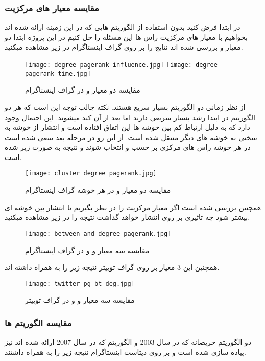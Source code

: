 \documentclass[12pt]{article}
\begin{document}
\subsubsection{مقایسه معیار های مرکزیت}

در ابتدا فرض کنيد بدون استفاده از الگوريتم هايی که در اين زمينه ارائه شده اند بخواهيم با معيار های
مرکزيت راس ها اين مسئله را حل کنيم در اين پروژه ابتدا دو معيار 
 و 
  بررسی شده اند 
نتايج را بر روی گراف اينستاگرام در زير مشاهده ميکنيد.

\begin{figure}[htbp]
\texttt{[image: degree pagerank influence.jpg]}
\texttt{[image: degree pagerank time.jpg]}
\caption{
مقایسه دو معیار
و
در گراف اینستاگرام
}
\end{figure}
\newpage

از نظر زمانی دو الگوريتم بسيار سريع هستند.
نکته جالب توجه اين است که هر دو الگوريتم در ابتدا رشد بسيار سريعی دارند اما بعد از آن کند ميشوند. 
اين احتمال وجود دارد که به دليل ارتباط کم بين خوشه ها اين اتفاق افتاده است و انتشار از خوشه به سختی 
به خوشه های ديگر منتقل شده است. از اين رو در مرحله بعد سعی شده است در هر خوشه راس های
مرکزی بر حسب 
 و 
انتخاب شوند و نتيجه به صورت زير شده است.

\begin{figure}[htbp]
\centering
\texttt{[image: cluster degree pagerank.jpg]}
\caption{
مقایسه دو معیار
و
در هر خوشه گراف اینستاگرام
}
\end{figure}


همچنين بررسی شده است اگر معيار مرکزيت را 
 در نظر بگيريم تا انتشار بين خوشه ای
بيشتر شود چه تاثيری بر روی انتشار خواهد گذاشت نتيجه را در زير مشاهده ميکنيد.


\begin{figure}[htbp]
\centering
\texttt{[image: between and degree pagerank.jpg]}
\caption{
مقایسه سه معیار
و
و
در گراف اینستاگرام
}
\end{figure}

\newpage
همچنين اين 3 معيار بر روی گراف توييتر نتيجه زير را به همراه داشته اند.
\begin{figure}[htbp]
\centering
\texttt{[image: twitter pg bt deg.jpg]}
\caption{
مقایسه سه معیار
و
و
در گراف توییتر
}
\end{figure}


\subsubsection{مقایسه الگوریتم ها}
دو الگوریتم حریصانه که در سال 2003 و الگوریتم 
که در سال 2007 
ارائه شده اند نیز پیاده سازی شده است و بر روی دیتاست اینستاگرام نتیجه زیر را به همراه داشتند.
\end{document}
